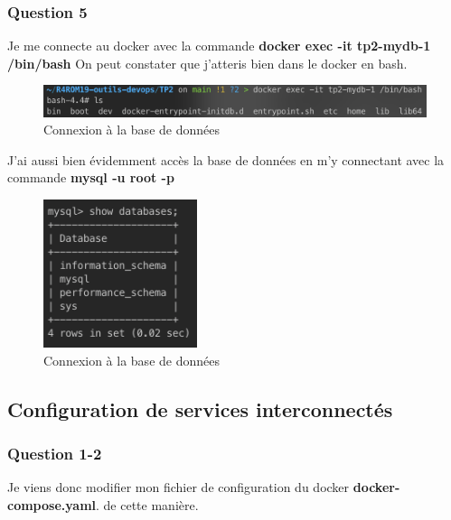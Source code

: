 \documentclass[12pt, a4paper]{article}
\begin{document}
\subsubsection{Question 5}
Je me connecte au docker avec la commande \textbf{docker exec -it tp2-mydb-1 /bin/bash}
On peut constater que j'atteris bien dans le docker en bash.
\begin{figure}[h]
    \centering
    \includegraphics[width=1\textwidth]{img/connexion.png}
    \caption{Connexion à la base de données}
    \label{fig:connexion}
\end{figure}

\newpage
J'ai aussi bien évidemment accès la base de données en m'y connectant avec la commande \textbf{mysql -u root -p}
\begin{figure}[h]
    \centering
    \includegraphics[width=0.4\textwidth]{img/bdd.png}
    \caption{Connexion à la base de données}
    \label{fig:bdd}
\end{figure}

\subsection*{Configuration de services interconnectés}
\subsubsection{Question 1-2}
Je viens donc modifier mon fichier de configuration du docker \textbf{docker-compose.yaml}.
de cette manière. 
\end{document}
